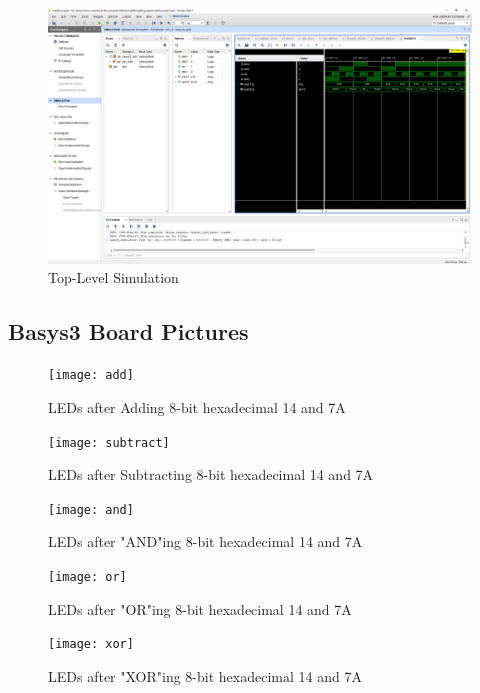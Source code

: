 \documentclass[11pt]{article}
\begin{document}
\begin{figure}[ht]\centering
\includegraphics[width=1\textwidth,trim=19cm 15cm 0.5cm 4.5cm,clip]{top_level_sim}
	\caption{Top-Level Simulation}
	\label{fig:sim_with_table}
\end{figure}

\subsection*{Basys3 Board Pictures}

\begin{figure}[ht]\centering
\texttt{[image: add]}
	\caption{LEDs after Adding 8-bit hexadecimal 14 and 7A}
	\label{fig:sim_with_table}
\end{figure}

\begin{figure}[ht]\centering
\texttt{[image: subtract]}
	\caption{LEDs after Subtracting 8-bit hexadecimal 14 and 7A}
	\label{fig:sim_with_table}
\end{figure}

\begin{figure}[ht]\centering
\texttt{[image: and]}
	\caption{LEDs after "AND"ing 8-bit hexadecimal 14 and 7A}
	\label{fig:sim_with_table}
\end{figure}

\begin{figure}[ht]\centering
\texttt{[image: or]}
	\caption{LEDs after "OR"ing  8-bit hexadecimal 14 and 7A}
	\label{fig:sim_with_table}
\end{figure}

\begin{figure}[ht]\centering
\texttt{[image: xor]}
	\caption{LEDs after "XOR"ing 8-bit hexadecimal 14 and 7A}
	\label{fig:sim_with_table}
\end{figure}
\end{document}
